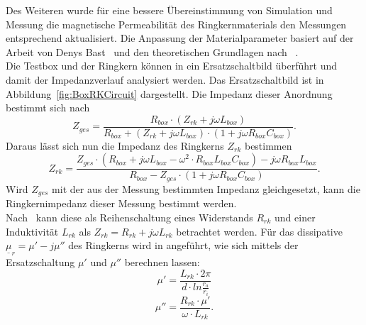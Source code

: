             \par
            Des Weiteren wurde für eine bessere Übereinstimmung von Simulation und Messung die magnetische Permeabilität des Ringkernmaterials den Messungen entsprechend aktualisiert. Die Anpassung der Materialparameter basiert auf der Arbeit von Denys Bast~\citep{bast2017ba} und den theoretischen Grundlagen nach ~\citep{Klingbeil2008}.\\
            Die Testbox und der Ringkern können in ein Ersatzschaltbild überführt und damit der Impedanzverlauf analysiert werden. Das Ersatzschaltbild ist in Abbildung~\ref{fig:BoxRKCircuit} dargestellt. Die Impedanz dieser Anordnung bestimmt sich nach
                \begin{equation}\label{eq:Zges}
                    Z_{ges} = \frac{R_{box}\cdot(Z_{rk}+j\omega L_{box})}{R_{box}+(Z_{rk}+j\omega L_{box})\cdot(1+j\omega R_{box}C_{box})}.
                \end{equation}
            Daraus lässt sich nun die Impedanz des Ringkerns $Z_{rk}$ bestimmen
                \begin{equation}\label{eq:Zrk}
                Z_{rk} = \frac{Z_{ges}\cdot(R_{box}+j\omega L_{box}-\omega^2\cdot R_{box}L_{box}C_{box}) - j\omega R_{box}L_{box}}{R_{box}-Z_{ges}\cdot(1+j\omega R_{box}C_{box})}.
                \end{equation}
            Wird $Z_{ges}$ mit der aus der Messung bestimmten Impedanz gleichgesetzt, kann die Ringkernimpedanz dieser Messung bestimmt werden.\\
            Nach~\cite{Klingbeil2008} kann diese als Reihenschaltung eines Widerstands $R_{rk}$ und einer Induktivität $L_{rk}$ als $Z_{rk} = R_{rk}+j\omega L_{rk}$ betrachtet werden. Für das dissipative $\underline{\mu}_r = \mu' -j\mu''$  des Ringkerns wird in \cite{bast2017ba} angef\"uhrt, wie sich mittels der Ersatzschaltung $\mu'$ und $\mu''$ berechnen lassen:
                \begin{equation}
                    \mu' = \frac{L_{rk}\cdot 2\pi}{d\cdot ln\frac{r_a}{r_i}}
                \end{equation} 
                \begin{equation}
                \mu'' = \frac{R_{rk}\cdot\mu'}{\omega\cdot L_{rk}} .
                \end{equation}
            
